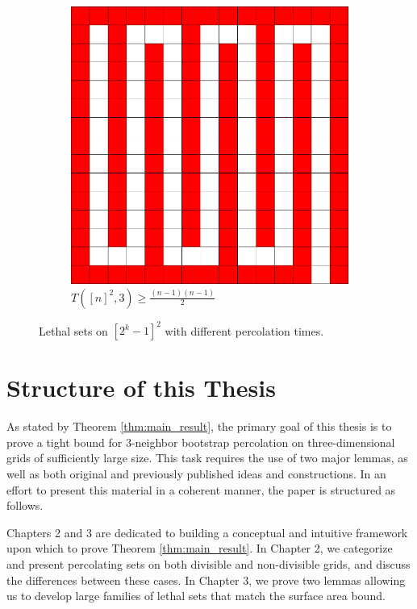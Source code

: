 \begin{figure}[]
\begin{subfigure}{0.4\textwidth}
	\includegraphics[width=\textwidth]{figures/1/15x15x1_slow.pdf}
	\caption{$T([n]^2,3) \geq \frac{(n-1)(n-1)}{2}$}
	\label{fig:slow}
\end{subfigure}
\caption{Lethal sets on $[2^k-1]^2$ with different percolation times.}
\label{fig:percolation_time}
\end{figure} 


\section{Structure of this Thesis}

As stated by Theorem \ref{thm:main_result}, the primary goal of this thesis is to prove a tight bound for 3-neighbor bootstrap percolation on three-dimensional grids of sufficiently large size. This task requires the use of two major lemmas, as well as both original and previously published ideas and constructions. In an effort to present this material in a coherent manner, the paper is structured as follows. 

Chapters 2 and 3 are dedicated to building a conceptual and intuitive framework upon which to prove Theorem \ref{thm:main_result}. In Chapter 2, we categorize and present percolating sets on both divisible and non-divisible grids, and discuss the differences between these cases. In Chapter 3, we prove two lemmas allowing us to develop large families of lethal sets that match the surface area bound. 

